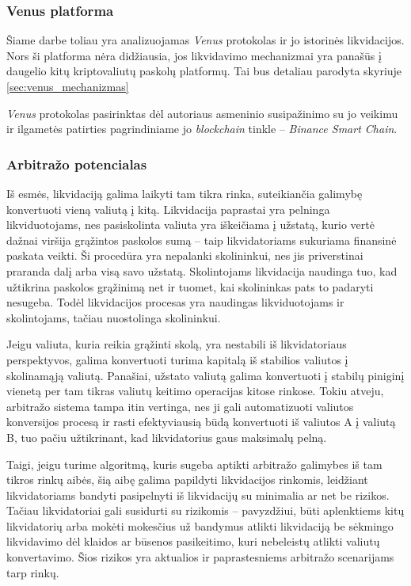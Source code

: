 \documentclass[]{VUMIFTemplateClass}
\begin{document}
\subsubsection{Venus platforma}
Šiame darbe toliau yra analizuojamas \textit{Venus} protokolas ir jo istorinės likvidacijos. Nors ši platforma nėra didžiausia, jos likvidavimo mechanizmai yra panašūs į daugelio kitų kriptovaliutų paskolų platformų. Tai bus detaliau parodyta skyriuje \ref{sec:venus_mechanizmas}

\textit{Venus} protokolas pasirinktas dėl autoriaus asmeninio susipažinimo su jo veikimu ir ilgametės patirties pagrindiniame jo \textit{blockchain} tinkle – \textit{Binance Smart Chain}.

\subsubsection{Arbitražo potencialas}
Iš esmės, likvidaciją galima laikyti tam tikra rinka, suteikiančia galimybę konvertuoti vieną valiutą į kitą. Likvidacija paprastai yra pelninga likviduotojams, nes pasiskolinta valiuta yra iškeičiama į užstatą, kurio vertė dažnai viršija grąžintos paskolos sumą – taip likvidatoriams sukuriama finansinė paskata veikti. Ši procedūra yra nepalanki skolininkui, nes jis priverstinai praranda dalį arba visą savo užstatą. Skolintojams likvidacija naudinga tuo, kad užtikrina paskolos grąžinimą net ir tuomet, kai skolininkas pats to padaryti nesugeba. Todėl likvidacijos procesas yra naudingas likviduotojams ir skolintojams, tačiau nuostolinga skolininkui.

Jeigu valiuta, kuria reikia grąžinti skolą, yra nestabili iš likvidatoriaus perspektyvos, galima konvertuoti turima kapitalą iš stabilios valiutos į skolinamąją valiutą. Panašiai, užstato valiutą galima konvertuoti į stabilų piniginį vienetą per tam tikras valiutų keitimo operacijas kitose rinkose. Tokiu atveju, arbitražo sistema tampa itin vertinga, nes ji gali automatizuoti valiutos konversijos procesą ir rasti efektyviausią būdą konvertuoti iš valiutos A į valiutą B, tuo pačiu užtikrinant, kad likvidatorius gaus maksimalų pelną.

Taigi, jeigu turime algoritmą, kuris sugeba aptikti arbitražo galimybes iš tam tikros rinkų aibės, šią aibę galima papildyti likvidacijos rinkomis, leidžiant likvidatoriams bandyti pasipelnyti iš likvidacijų su minimalia ar net be rizikos. Tačiau likvidatoriai gali susidurti su rizikomis -- pavyzdžiui, būti aplenktiems kitų likvidatorių arba mokėti mokesčius už bandymus atlikti likvidaciją be sėkmingo likvidavimo dėl klaidos ar būsenos pasikeitimo, kuri nebeleistų atlikti valiutų konvertavimo. Šios rizikos yra aktualios ir paprastesniems arbitražo scenarijams tarp rinkų.
\end{document}
